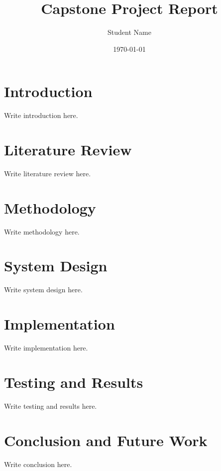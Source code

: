 ﻿\documentclass[12pt,a4paper]{report}
\title{Capstone Project Report}
\author{Student Name}
\date{\today}
\begin{document}
\maketitle

\tableofcontents

\chapter{Introduction}

Write introduction here.

\chapter{Literature Review}

Write literature review here.

\chapter{Methodology}

Write methodology here.

\chapter{System Design}

Write system design here.

\chapter{Implementation}

Write implementation here.

\chapter{Testing and Results}

Write testing and results here.

\chapter{Conclusion and Future Work}

Write conclusion here.



\end{document}
